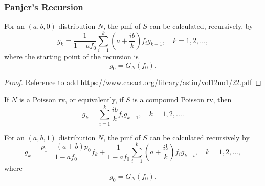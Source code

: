 \documentclass[notoc,notitlepage]{tufte-book}
\begin{document}
\subsubsection{Panjer's Recursion}%
\label{ssub:panjer_s_recursion}

\begin{thm}\label{thm:panjer_s_recursion_for_a_b_0_class}
  For an $(a, b, 0)$ distribution $N$, the pmf of $S$ can be calculated, recursively, by
  \begin{equation*}
    g_k = \frac{1}{1 - af_0} \sum_{i=1}^{k} \left( a + \frac{ib}{k} \right) f_i g_{k - 1}, \quad k = 1, 2, \ldots,
  \end{equation*}
  where the starting point of the recursion is
  \begin{equation*}
    g_0 = G_N(f_0).
  \end{equation*}
\end{thm}

\begin{proof}
   Reference to add \url{https://www.casact.org/library/astin/vol12no1/22.pdf}
\end{proof}

\begin{eg}
  If $N$ is a Poisson rv, or equivalently, if $S$ is a compound Poisson rv, then
  \begin{equation*}
    g_k = \sum_{i=1}^{k} \frac{ib}{k} f_i g_{k - 1}, \quad k = 1, 2, \ldots.
  \end{equation*}
\end{eg}

\begin{thm}\label{thm:panjer_s_recursion_for_a_b_1_class}
  For an $(a, b, 1)$ distribution $N$, the pmf of $S$ can be calculated recursively by
  \begin{equation*}
    g_k = \frac{p_1 - (a + b)p_0}{1 - af_0} f_k + \frac{1}{1 - af_0} \sum_{i=1}^{k} \left( a + \frac{ib}{k} \right) f_i g_{k - i}, \quad k = 1, 2, ...,
  \end{equation*}
  where
  \begin{equation*}
    g_0 = G_N(f_0).
  \end{equation*}
\end{thm}


\end{document}
